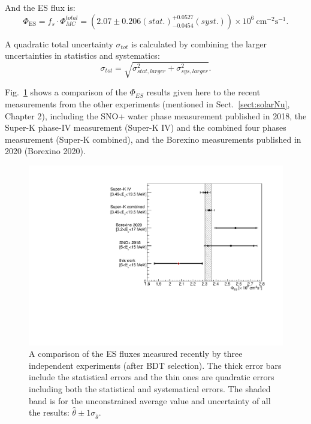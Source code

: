 And the ES flux is:
\begin{equation}
\Phi_{\mathrm{ES}}=f_s\cdot \Phi^{total}_{MC}=(2.07\pm 0.206(stat.)^{+0.0527}_{-0.0454} (syst.))\times 10^6~\mathrm{cm^{-2}s^{-1}}.
\end{equation}

A quadratic total uncertainty $\sigma_{tot}$ is calculated by combining the larger uncertainties in statistics and systematics:
\begin{equation}
\sigma_{tot}=\sqrt{\sigma^2_{stat,larger}+\sigma^2_{sys,larger}}.
\end{equation}

Fig.~\ref{fig:ESfluxCompare} shows a comparison of the $\Phi_{ES}$ results given here to the recent measurements from the other experiments (mentioned in Sect.~\ref{sect:solarNu}, Chapter 2), including the SNO+ water phase measurement published in 2018\cite{anderson2019measurement}, the Super-K phase-IV measurement (Super-K IV) and the combined four phases measurement (Super-K combined)\cite{abe2016solar}, and the Borexino measurements published in 2020 (Borexino 2020)\cite{agostini2020improved}.

\begin{figure}[!htb]
	\centering
	\includegraphics[width=12cm]{ESfluxCompare.pdf}
	\caption[A comparison of the ES flux measured recently by three independent experiments (after BDT selection).]{A comparison of the ES fluxes measured recently by three independent experiments (after BDT selection). The thick error bars include the statistical errors and the thin ones are quadratic errors including both the statistical and systematical errors. The shaded band is for the unconstrained average value and uncertainty of all the results: $\hat \theta \pm 1\sigma_{\hat \theta}$.}
	\label{fig:ESfluxCompare}
\end{figure}

